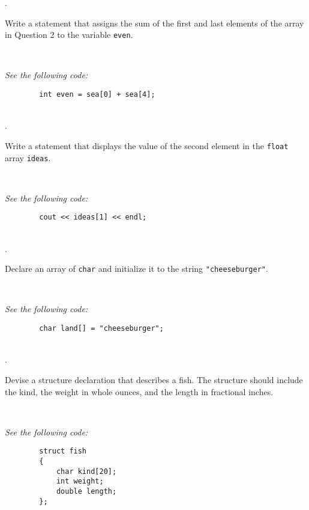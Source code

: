 \documentclass{amsart}
\begin{document}
. 
\begin{minipage}[t]{11.5 cm}
	Write a statement that assigns the sum of the first and last elements of the array in Question 2 to the variable \texttt{even}.
\end{minipage} \\
\phantom{3. } 
\begin{minipage}[t]{11.5 cm}
	{\slshape See the following code:}
	\begin{verbatim}
		int even = sea[0] + sea[4];
	\end{verbatim}
\end{minipage} 
\\[.2cm]

. 
\begin{minipage}[t]{11.5 cm}
	Write a statement that displays the value of the second element in the \texttt{float} array \texttt{ideas}.
\end{minipage} \\
\phantom{2. } 
\begin{minipage}[t]{11.5 cm}
	{\slshape See the following code:}
	\begin{verbatim}
		cout << ideas[1] << endl;
	\end{verbatim}
\end{minipage} 
\\[.2cm]

. 
\begin{minipage}[t]{11.5 cm}
	Declare an array of \texttt{char} and initialize it to the string \verb+"cheeseburger"+. 
\end{minipage} \\
\phantom{3. } 
\begin{minipage}[t]{11.5 cm}
	{\slshape See the following code:}
	\begin{verbatim}
		char land[] = "cheeseburger";
	\end{verbatim}
\end{minipage} 
\\[.2cm]

. 
\begin{minipage}[t]{11.5 cm}
	Devise a structure declaration that describes a fish. The structure should include the kind, the weight in whole ounces, and the length in fractional inches.
\end{minipage} \\
\phantom{3. } 
\begin{minipage}[t]{11.5 cm}
	{\slshape See the following code:}
	\begin{verbatim}
		struct fish
		{
		    char kind[20];
		    int weight;
		    double length;
		};
	\end{verbatim}
\end{minipage} 
\\[.2cm]
\end{document}
